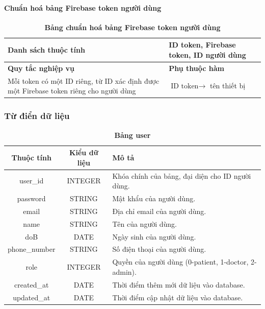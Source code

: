 \paragraph{Chuẩn hoá bảng Firebase token người dùng}
\mbox{}

\begin{table}[H]
  \caption{\bfseries \fontsize{12pt}{0pt}\selectfont Bảng chuẩn hoá bảng Firebase token người dùng}
  \centering
  \begin{tabularx}{0.9\textwidth}{|X|X|}
    \hline
    \textbf{Danh sách thuộc tính} & ID token, Firebase token, ID người dùng \\ %
    \hline
    \textbf{Quy tắc nghiệp vụ} & \textbf{Phụ thuộc hàm} \\
    \hline
    Mỗi token có một ID riêng, từ ID xác định được một Firebase token riêng cho người dùng & \parbox[t]{\linewidth}{$\text{ID token} \rightarrow$ tên thiết bị} \\
    \hline
     \\
     \\
    \hline
  \end{tabularx}
\end{table}




\subsubsection{Từ điển dữ liệu}



\begin{table}[H]
  \caption{\bfseries \fontsize{12pt}{0pt}\selectfont Bảng user}
  \centering
  \begin{tabularx}{0.9\textwidth}{|c|c|X|}
    \hline
    \textbf{Thuộc tính} & \textbf{Kiểu dữ liệu} & \textbf{Mô tả} \\
    \hline
    user\_id & INTEGER & Khóa chính của bảng, đại diện cho ID người dùng. \\
    \hline
    password & STRING & Mật khẩu của người dùng. \\
    \hline
    email & STRING & Địa chỉ email của người dùng. \\
    \hline
    name & STRING & Tên của người dùng. \\
    \hline
    doB & DATE & Ngày sinh của người dùng. \\
    \hline
    phone\_number & STRING & Số điện thoại của người dùng. \\
    \hline
    role & INTEGER & Quyền của người dùng (0-patient, 1-doctor, 2-admin). \\
    \hline
    created\_at & DATE & Thời điểm thêm mới dữ liệu vào database. \\
    \hline
    updated\_at & DATE & Thời điểm cập nhật dữ liệu vào database. \\
    \hline
    
  \end{tabularx}
\end{table}

